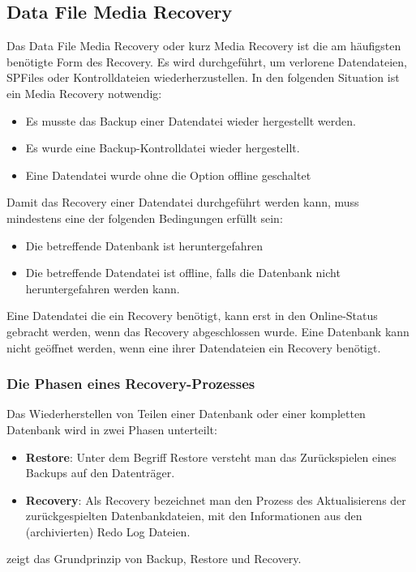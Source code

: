       \subsection{Data File Media Recovery}
        Das Data File Media Recovery oder kurz Media Recovery ist die am häufigsten benötigte Form des Recovery. Es wird durchgeführt, um verlorene Datendateien, SPFiles oder Kontrolldateien wiederherzustellen. In den folgenden Situation ist ein Media Recovery notwendig:
        \begin{itemize}
          \item Es musste das Backup einer Datendatei wieder hergestellt werden.
          \item Es wurde eine Backup-Kontrolldatei wieder hergestellt.
          \item Eine Datendatei wurde ohne die Option  offline geschaltet
        \end{itemize}
        Damit das Recovery einer Datendatei durchgeführt werden kann, muss mindestens eine der folgenden Bedingungen erfüllt sein:
        \begin{itemize}
          \item Die betreffende Datenbank ist heruntergefahren
          \item Die betreffende Datendatei ist offline, falls die Datenbank nicht heruntergefahren werden kann.
        \end{itemize}
        Eine Datendatei die ein Recovery benötigt, kann erst in den Online-Status gebracht werden, wenn das Recovery abgeschlossen wurde. Eine Datenbank kann nicht geöffnet werden, wenn eine ihrer Datendateien ein Recovery benötigt.
        \subsubsection{Die Phasen eines Recovery-Prozesses}
          Das Wiederherstellen von Teilen einer Datenbank oder einer kompletten Datenbank wird in zwei Phasen unterteilt:
          \begin{itemize}
            \item \textbf{Restore}: Unter dem Begriff Restore versteht man das Zurückspielen eines Backups auf den Datenträger.
            \item \textbf{Recovery}: Als Recovery bezeichnet man den Prozess des Aktualisierens der zu\-rück\-ge\-spielten Datenbank\-dateien, mit den Informationen aus den (archivierten) Redo Log Dateien.
          \end{itemize}
           zeigt das Grundprinzip von Backup, Restore und Recovery.

